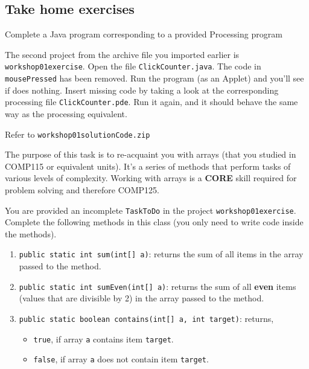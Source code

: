 \begin{questions}
\newpage
\section*{Take home exercises}

\question Complete a Java program corresponding to a provided Processing program \vskip 0.5cm

The second project from the archive file you imported earlier is \texttt{workshop01exercise}. Open the file \texttt{ClickCounter.java}. The code in \texttt{mousePressed} has been removed. Run the program (as an Applet) and you'll see if does nothing. Insert missing code by taking a look at the corresponding processing file \texttt{ClickCounter.pde}. Run it again, and it should behave the same way as the processing equivalent.

\begin{solution}
Refer to \texttt{workshop01solutionCode.zip}	
\end{solution}

\question The purpose of this task is to re-acquaint you with arrays (that you studied in COMP115 or equivalent units). It's a series of methods that perform tasks of various levels of complexity. Working with arrays is a \textbf{CORE} skill required for problem solving and therefore COMP125. 

You are provided an incomplete \texttt{TaskToDo} in the project \texttt{workshop01exercise}. Complete the following methods in this class (you only need to write code inside the methods). 

\begin{enumerate}
\item \texttt{public static int sum(int[] a)}: returns the sum of all items in the array passed to the method. 

\item \texttt{public static int sumEven(int[] a)}: returns the sum of all \textbf{even} items (values that are divisible by 2) in the array passed to the method. 

\item \texttt{public static boolean contains(int[] a, int target)}: returns,
	
	\begin{itemize}
		\item \texttt{true}, if array \texttt{a} contains item \texttt{target}.
		\item \texttt{false}, if array \texttt{a} does not contain item \texttt{target}.
	\end{itemize}
 

\end{enumerate}
\end{questions}
